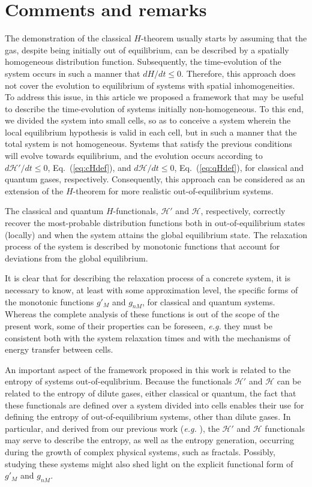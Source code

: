 \section{Comments and remarks}\label{sec:disscussion}

The demonstration of the classical $H$-theorem usually starts by assuming that the gas,
despite being initially out of equilibrium, can be described by a
spatially homogeneous distribution function. 
Subsequently, the time-evolution of the system occurs in such a manner that $dH/dt \leq 0$. 
Therefore, this approach does not cover the evolution to equilibrium of systems with spatial inhomogeneities.
To address this issue, in this article we
proposed a framework that may be useful to describe the time-evolution of systems
initially non-homogeneous. To this end, we divided the
system into small cells, so as to conceive a system wherein the local equilibrium
hypothesis is valid in each cell, but in such a manner that the total system is not homogeneous. Systems
that satisfy the previous conditions will evolve towards equilibrium, and the evolution
occurs according to $d\mathcal{H}'/dt\leq0$, Eq.~(\ref{eq:cHdef}),
and $d\mathcal{H}/dt\leq0$, Eq.~(\ref{eq:qHdef}), for classical and quantum gases, respectively.
Consequently, this approach can be considered as an extension of the $H$-theorem
for more realistic out-of-equilibrium systems.

The classical and quantum $H$-functionals, $\mathcal{H}'$ and $\mathcal{H}$, respectively,
correctly recover the most-probable distribution
functions both in out-of-equilibrium states (locally) and when the system attains the global
equilibrium state. The relaxation process of the system is described by
monotonic functions that account for deviations from the global equilibrium.

It is clear that for describing the relaxation process of a concrete system,
it is necessary to know, at least with some approximation level, the specific forms of the
monotonic functions $g'_M$ and $g_{nM}$, for classical and quantum systems.
Whereas the complete analysis of these functions is out of the scope of the present work,
some of their properties can be foreseen, \textit{e.g.} they must
be consistent both with the system relaxation times and with the mechanisms of 
energy transfer between cells.

An important aspect of the framework proposed in this work is related to the entropy of systems
out-of-equlibrium. Because the functionals $\mathcal{H}'$ and $\mathcal{H}$ can be related to
the entropy of dilute gases, either classical or quantum, the fact that these functionals are defined
over a system divided into cells enables their use for defining the entropy
of out-of-equilibrium systems, other than dilute gases. In particular, and 
derived from our previous work (\textit{e.g.} \cite{bib:nicolas2020,bib:nicolas2016}), the
$\mathcal H'$ and $\mathcal H$ functionals may serve to describe the entropy,
as well as the entropy generation, occurring during the
growth of complex physical systems, such as fractals. Possibly, studying these systems might also
shed light on the explicit functional form of $g'_M$ and $g_{nM}$.

